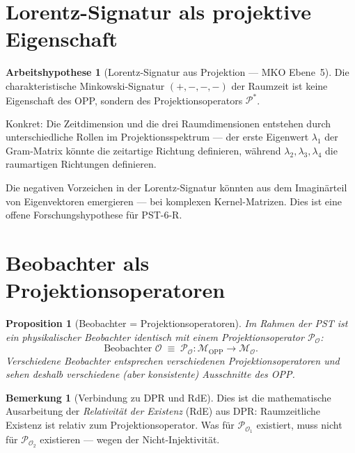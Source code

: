 \documentclass[11pt,a4paper]{article}
\theoremstyle{plain}
\newtheorem{proposition}{Proposition}[section]
\theoremstyle{definition}
\newtheorem{remark}{Bemerkung}[section]
\newtheorem{hypothese}{Arbeitshypothese}[section]
\newcommand{\OPP}{\mathcal{M}_{\mathrm{OPP}}}
\newcommand{\Proj}{\mathcal{P}}
\begin{document}
\section{Lorentz-Signatur als projektive Eigenschaft}

\begin{hypothese}[Lorentz-Signatur aus Projektion --- MKO Ebene~5]
Die charakteristische Minkowski-Signatur $(+,-,-,-)$ der Raumzeit ist
keine Eigenschaft des OPP, sondern des Projektionsoperators $\Proj^\ast$.

Konkret: Die Zeitdimension und die drei Raumdimensionen entstehen durch
unterschiedliche Rollen im Projektionsspektrum --- der erste Eigenwert
$\lambda_1$ der Gram-Matrix k\"{o}nnte die zeitartige Richtung
definieren, w\"{a}hrend $\lambda_2, \lambda_3, \lambda_4$ die raumartigen
Richtungen definieren.

Die negativen Vorzeichen in der Lorentz-Signatur k\"{o}nnten aus dem
Imagin\"{a}rteil von Eigenvektoren emergieren --- bei komplexen
Kernel-Matrizen. Dies ist eine offene Forschungshypothese f\"{u}r PST-6-R.
\end{hypothese}

\section{Beobachter als Projektionsoperatoren}

\begin{proposition}[Beobachter = Projektionsoperatoren]
Im Rahmen der PST ist ein physikalischer Beobachter identisch mit
einem Projektionsoperator $\Proj_{\mathcal{O}}$:
\[
  \text{Beobachter } \mathcal{O}
  \;\equiv\;
  \Proj_{\mathcal{O}}\colon \OPP \to \mathcal{M}_{\mathcal{O}}.
\]
Verschiedene Beobachter entsprechen verschiedenen Projektionsoperatoren
und \glqq{}sehen\grqq{} deshalb verschiedene (aber konsistente)
Ausschnitte des OPP.
\end{proposition}

\begin{remark}[Verbindung zu DPR und RdE]
Dies ist die mathematische Ausarbeitung der \emph{Relativit\"{a}t der
Existenz} (RdE) aus DPR: Raumzeitliche Existenz ist relativ zum
Projektionsoperator. Was f\"{u}r $\Proj_{\mathcal{O}_1}$ existiert, muss
nicht f\"{u}r $\Proj_{\mathcal{O}_2}$ existieren --- wegen der
Nicht-Injektivit\"{a}t.
\end{remark}
\end{document}
